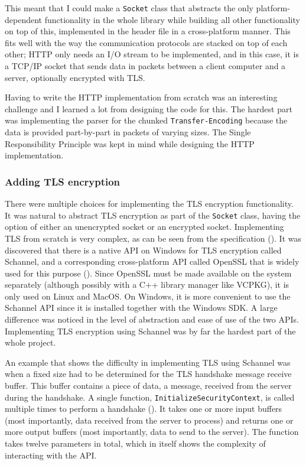 \documentclass[12pt, a4paper]{article}
\begin{document}
This meant that I could make a \texttt{Socket} class that abstracts the only platform-dependent functionality in the whole library while building all other functionality on top of this, implemented in the header file in a cross-platform manner. This fits well with the way the communication protocols are stacked on top of each other; HTTP only needs an I/O stream to be implemented, and in this case, it is a TCP/IP socket that sends data in packets between a client computer and a server, optionally encrypted with TLS. 

Having to write the HTTP implementation from scratch was an interesting challenge and I learned a lot from designing the code for this. The hardest part was implementing the parser for the chunked \texttt{Transfer-Encoding} because the data is provided part-by-part in packets of varying sizes. The Single Responsibility Principle was kept in mind while designing the HTTP implementation.
\subsubsection{Adding TLS encryption}
There were multiple choices for implementing the TLS encryption functionality. It was natural to abstract TLS encryption as part of the \texttt{Socket} class, having the option of either an unencrypted socket or an encrypted socket. Implementing TLS from scratch is very complex, as can be seen from the specification (\cite{TlsSpec}). It was discovered that there is a native API on Windows for TLS encryption called Schannel, and a corresponding cross-platform API called OpenSSL that is widely used for this purpose (\cite{OpenSSL}). Since OpenSSL must be made available on the system separately (although possibly with a C++ library manager like VCPKG), it is only used on Linux and MacOS. On Windows, it is more convenient to use the Schannel API since it is installed together with the Windows SDK. A large difference was noticed in the level of abstraction and ease of use of the two APIs. Implementing TLS encryption using Schannel was by far the hardest part of the whole project. 

An example that shows the difficulty in implementing TLS using Schannel was when a fixed size had to be determined for the TLS handshake message receive buffer. This buffer contains a piece of data, a message, received from the server during the handshake. A single function, \texttt{InitializeSecurityContext}, is called multiple times to perform a handshake (\cite{MicrosoftInitializeSecurityContext}). It takes one or more input buffers (most importantly, data received from the server to process) and returns one or more output buffers (most importantly, data to send to the server). The function takes twelve parameters in total, which in itself shows the complexity of interacting with the API.
\end{document}
